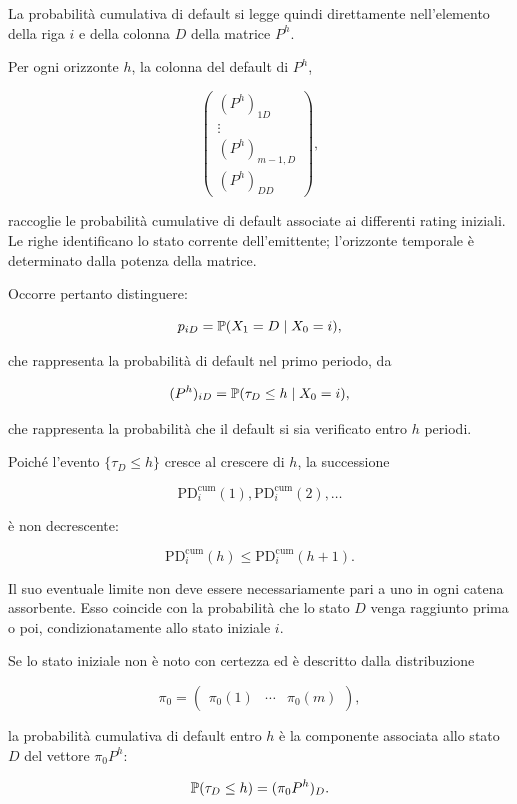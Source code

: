 La probabilit\`{a} cumulativa di default si legge quindi direttamente
nell'elemento della riga $i$ e della colonna $D$ della matrice
$P^h$.

Per ogni orizzonte $h$, la colonna del default di $P^h$,

\[
\begin{pmatrix}
(P^h)_{1D}\\
\vdots\\
(P^h)_{m-1,D}\\
(P^h)_{DD}
\end{pmatrix},
\]

raccoglie le probabilit\`{a} cumulative di default associate ai
differenti rating iniziali. Le righe identificano lo stato corrente
dell'emittente; l'orizzonte temporale \`{e} determinato dalla potenza
della matrice.

Occorre pertanto distinguere:

\[
p_{iD}
=
\mathbb{P}(X_1=D\mid X_0=i),
\]

che rappresenta la probabilit\`{a} di default nel primo periodo, da

\[
(P^h)_{iD}
=
\mathbb{P}(\tau_D\leq h\mid X_0=i),
\]

che rappresenta la probabilit\`{a} che il default si sia verificato
entro $h$ periodi.

Poich\'{e} l'evento $\{\tau_D\leq h\}$ cresce al crescere di $h$,
la successione

\[
\mathrm{PD}_{i}^{\mathrm{cum}}(1),
\mathrm{PD}_{i}^{\mathrm{cum}}(2),
\ldots
\]

\`{e} non decrescente:

\[
\mathrm{PD}_{i}^{\mathrm{cum}}(h)
\leq
\mathrm{PD}_{i}^{\mathrm{cum}}(h+1).
\]

Il suo eventuale limite non deve essere necessariamente pari a uno in
ogni catena assorbente. Esso coincide con la probabilit\`{a} che lo
stato $D$ venga raggiunto prima o poi, condizionatamente allo stato
iniziale $i$.

Se lo stato iniziale non \`{e} noto con certezza ed \`{e} descritto
dalla distribuzione

\[
\pi_0
=
\begin{pmatrix}
\pi_0(1)&\cdots&\pi_0(m)
\end{pmatrix},
\]

la probabilit\`{a} cumulativa di default entro $h$ \`{e} la
componente associata allo stato $D$ del vettore $\pi_0P^h$:

\[
\mathbb{P}(\tau_D\leq h)
=
(\pi_0P^h)_D.
\]

